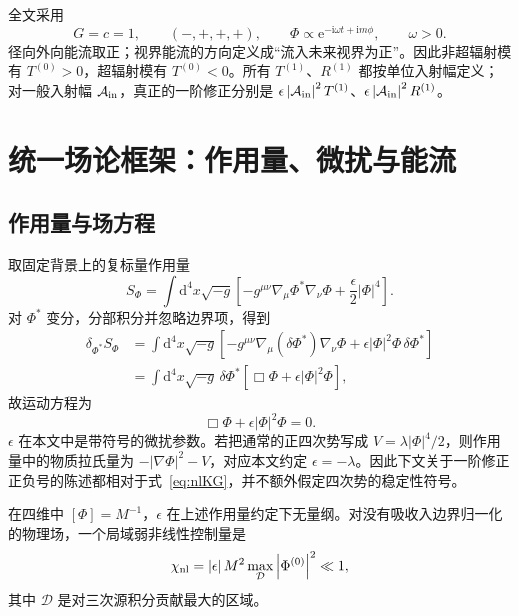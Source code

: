 \documentclass[UTF8,a4paper,11pt]{ctexart}
\newcommand{\dd}{\mathrm d}
\newcommand{\ii}{\mathrm i}
\newcommand{\ee}{\mathrm e}
\newcommand{\abs}[1]{\left|#1\right|}
\begin{document}
全文采用
\begin{equation}
G=c=1,\qquad (-,+,+,+),\qquad
\Phi\propto \ee^{-\ii\omega t+\ii m\phi},\qquad \omega>0.
\end{equation}
径向外向能流取正；视界能流的方向定义成“流入未来视界为正”。因此非超辐射模有 $T^{(0)}>0$，超辐射模有 $T^{(0)}<0$。所有 $T^{(1)}$、$R^{(1)}$ 都按单位入射幅定义；对一般入射幅 $\mathcal A_{\rm in}$，真正的一阶修正分别是 $\epsilon\abs{\mathcal A_{\rm in}}^2T^{(1)}$、$\epsilon\abs{\mathcal A_{\rm in}}^2R^{(1)}$。

\section{统一场论框架：作用量、微扰与能流}
\label{sec:field-theory}

\subsection{作用量与场方程}

取固定背景上的复标量作用量
\begin{equation}
S_\Phi=\int \dd^4x\sqrt{-g}\left[
-g^{\mu\nu}\nabla_\mu\Phi^*\nabla_\nu\Phi
+\frac{\epsilon}{2}\abs{\Phi}^4\right].
\label{eq:action}
\end{equation}
对 $\Phi^*$ 变分，分部积分并忽略边界项，得到
\begin{align}
\delta_{\Phi^*}S_\Phi
&=\int\dd^4x\sqrt{-g}\left[
-g^{\mu\nu}\nabla_\mu(\delta\Phi^*)\nabla_\nu\Phi
+\epsilon\abs{\Phi}^2\Phi\,\delta\Phi^*\right]\nonumber\\
&=\int\dd^4x\sqrt{-g}\,\delta\Phi^*
\left[\Box\Phi+\epsilon\abs{\Phi}^2\Phi\right],
\end{align}
故运动方程为
\begin{equation}
\boxed{\Box\Phi+\epsilon\abs{\Phi}^2\Phi=0.}
\label{eq:nlKG}
\end{equation}
$\epsilon$ 在本文中是带符号的微扰参数。若把通常的正四次势写成 $V=\lambda\abs{\Phi}^4/2$，则作用量中的物质拉氏量为 $-\abs{\nabla\Phi}^2-V$，对应本文约定 $\epsilon=-\lambda$。因此下文关于一阶修正正负号的陈述都相对于式~\eqref{eq:nlKG}，并不额外假定四次势的稳定性符号。

在四维中 $[\Phi]=M^{-1}$，$\epsilon$ 在上述作用量约定下无量纲。对没有吸收入边界归一化的物理场，一个局域弱非线性控制量是
\begin{equation}
\chi_{\rm nl}=\abs{\epsilon}M^2
\max_{\mathcal D}\abs{\Phi^{(0)}}^2\ll1,
\label{eq:chi}
\end{equation}
其中 $\mathcal D$ 是对三次源积分贡献最大的区域。
\end{document}
